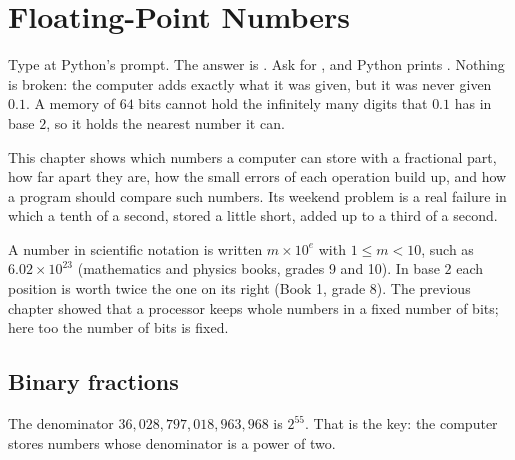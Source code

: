 \chapter{Floating-Point Numbers}\label{ch:g10:floating-point}

Type  at Python's prompt. The answer is . Ask for , and Python
prints . Nothing is broken: the computer adds exactly what it was given, but it was never
given $0.1$. A memory of $64$ bits cannot hold the infinitely many digits that $0.1$ has in base $2$, so it holds
the nearest number it can.

This chapter shows which numbers a computer can store with a fractional part, how far apart they are, how the
small errors of each operation build up, and how a program should compare such numbers. Its weekend problem is a
real failure in which a tenth of a second, stored a little short, added up to a third of a second.

\begin{recall}
A number in scientific notation is written $m \times 10^{e}$ with $1 \le m < 10$, such as $6.02 \times 10^{23}$
(mathematics and physics books, grades 9 and 10). In base $2$ each position is worth twice the one on its right
(Book 1, grade 8). The previous chapter showed that a processor keeps whole numbers in a fixed number of bits;
here too the number of bits is fixed.
\end{recall}

\section{Binary fractions}\label{sec:g10:floating-point:binary-fractions}

%
\label{lst:g10:floating-point:point-one}

\label{out:g10:floating-point:point-one}

The denominator $36{,}028{,}797{,}018{,}963{,}968$ is $2^{55}$. That is the key: the computer stores numbers whose
denominator is a power of two.

